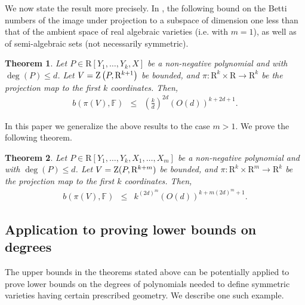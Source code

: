 \documentclass{amsart}
\newtheorem{theorem}{Theorem}
\theoremstyle{definition}
\theoremstyle{remark}
\numberwithin{equation}{section}
\begin{document}
We now state the result more precisely.
In \cite{BC2013},
the following
bound on the Betti numbers of the image under projection to a subspace of 
dimension one less than that of the ambient space of real algebraic varieties (i.e. with $m=1$), as well as of semi-algebraic sets (not
necessarily symmetric).

\begin{theorem} \cite{BC2013}
  \label{thm:descent2-quantitative}Let $P \in {\mathrm{R}} [ Y_{1} , \ldots ,Y_{k} ,X
  ]$ be a non-negative polynomial and with $\deg ( P ) \leq d$. Let $V= {{\rm Z}}
  \left( P, {\mathrm{R}}^{k+1} \right)$ be bounded, and $\pi : {\mathrm{R}}^{k} \times {\mathrm{R}}
  \longrightarrow{\mathrm{R}}^{k}$ be the projection map to the first $k$ coordinates.
  Then,
  \begin{eqnarray*}
    b ( \pi ( V ) ,{\mathbb{F}} ) & \leq &  \left( \frac{k}{d} \right)^{2d} ( O ( d ) )^{k+2d+1}.
  \end{eqnarray*}
\end{theorem}

In this paper we generalize the above results to the case $m>1$. We prove the following theorem.
\begin{theorem}
  \label{thm:descent2-quantitative-new}
  Let $P \in {\mathrm{R}} [ Y_{1} , \ldots ,Y_{k} ,X_1,\ldots,X_m]$ be a non-negative polynomial and with $\deg ( P ) \leq d$. Let $V= {{\rm Z}}(P, {\mathrm{R}}^{k+m})$ be bounded, and $\pi : {\mathrm{R}}^{k} \times {\mathrm{R}}^{m}
  \longrightarrow{\mathrm{R}}^{k}$ be the projection map to the first $k$ coordinates.
  Then,
  \begin{eqnarray*}
    b ( \pi ( V ) ,{\mathbb{F}} ) & \leq & k^{(2d)^m} (O(d))^{k+ m (2d)^m +1} .
  \end{eqnarray*}
\end{theorem}

\subsection{Application to proving lower bounds on degrees}
The upper bounds in the theorems stated above can be potentially applied to prove lower bounds on the degrees of polynomials needed to define symmetric varieties having certain prescribed geometry.
We describe one such example.
\end{document}
